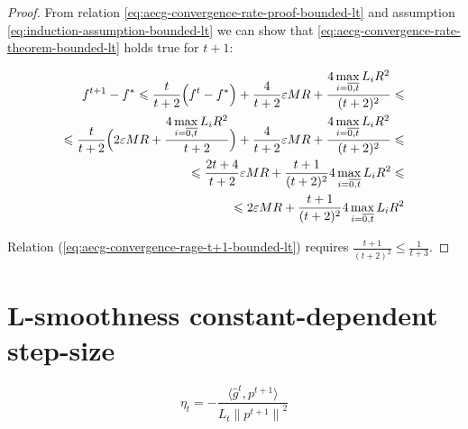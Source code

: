 \documentclass[runningheads, draft]{llncs}
\newcommand{\norm}[1]{\left\lVert#1\right\rVert}
\newcommand{\vprod}[1]{\langle#1\rangle}
\newcommand{\errgrad}{\hat{g}}
\begin{document}
\begin{proof}
    From relation \eqref{eq:aecg-convergence-rate-proof-bounded-lt} and
    assumption \eqref{eq:induction-assumption-bounded-lt} we can show that
    \eqref{eq:aecg-convergence-rate-theorem-bounded-lt} holds true for $t + 1$:

    \begin{equation}\label{eq:aecg-convergence-rage-t+1-bounded-lt}
        \begin{split}
            f^{t+1} - f^* \leqslant \frac{t}{t + 2}\Bigl(f^t - f^*\Bigr)+
            \frac{4}{t + 2} \varepsilon M R +
            \frac{4 \max\limits_{i=\overline{0,t}}L_i R^2}{(t + 2)^2}
            \leqslant \\
            \leqslant \frac{t}{t + 2}\Bigl(2 \varepsilon M R +
            \frac{4 \max\limits_{i=\overline{0,t}}L_i R^2}{t + 2}\Bigr) +
            \frac{4}{t + 2}\varepsilon M R +
            \frac{4 \max\limits_{i=\overline{0,t}}L_i R^2}{(t + 2)^2}
            \leqslant \\
            \leqslant \frac{2t + 4}{t + 2}\varepsilon M R +
            \frac{t + 1}{(t + 2)^2} 4 \max\limits_{i=\overline{0,t}}L_i R^2
            \leqslant \\
            \leqslant 2\varepsilon M R +
            \frac{t + 1}{(t + 2)^2} 4 \max\limits_{i=\overline{0,t}}L_i R^2
        \end{split}
    \end{equation}

    Relation (\ref{eq:aecg-convergence-rage-t+1-bounded-lt}) requires
    $\frac{t + 1}{(t + 2)^2} \leqslant \frac{1}{t + 3}$.

\end{proof}
%
\section{L-smoothness constant-dependent step-size}
%
\begin{equation}\label{eq:step-size-l-smoothness-constant-dependent}
    \eta_t = -\frac{\vprod{\errgrad^t, p^{t+1}}}{L_t \norm{p^{t+1}}^2}
\end{equation}
%
\end{document}
